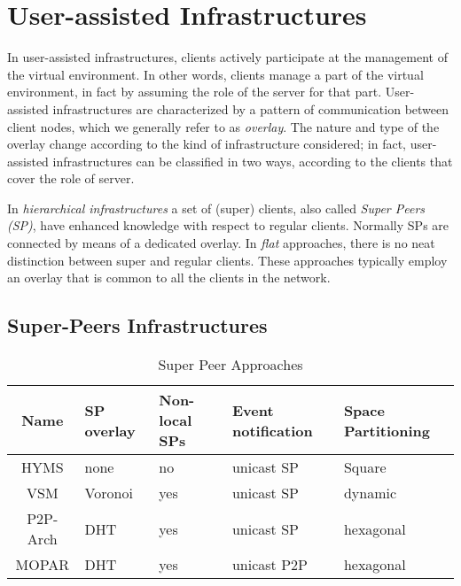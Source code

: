 \documentclass[final,10pt,a5paper]{phdimt}
\theoremstyle{definition}
\begin{document}
\section{User-assisted Infrastructures}
\label{p2p}

In user-assisted infrastructures, clients actively participate at the management of the virtual environment. 
In other words, clients manage a part of the virtual environment, in fact by assuming the role of the server for that part.
User-assisted infrastructures are characterized by a pattern of communication between client nodes, which we generally refer to as \textit{overlay}. The nature and type of the overlay change according to the kind of infrastructure considered; in fact, user-assisted infrastructures can be classified in two ways, according to the clients that cover the role of server.

In \textit{hierarchical infrastructures} a set of (super) clients, also called \textit{Super Peers (SP)}, have enhanced knowledge with respect to regular clients. Normally SPs are connected by means of a dedicated overlay.
In \textit{flat} approaches, there is no neat distinction between super and regular clients.
These approaches typically employ an overlay that is common to all the clients in the network.




\subsection{Super-Peers Infrastructures}


\begin{table}[tbh]
\centering
\begin{tabular}{|c|p{1.3cm}|p{1.4 cm}|p{1.8cm}|p{1.7 cm}|}
\hline
Name & SP \newline overlay & Non-local \newline SPs & Event \newline notification & Space \newline Partitioning \\
\hline
\hline
HYMS \cite{Kim2004} & none & no & unicast SP & Square\\
\hline
VSM \cite{hu2008voronoi} & Voronoi & yes & unicast SP & dynamic \\
\hline
P2P-Arch \cite{Hampel2006} & DHT & yes & unicast SP & hexagonal\\
\hline
MOPAR \cite{Vuong2005} & DHT & yes & unicast P2P & hexagonal\\
\hline
\end{tabular}
\caption{Super Peer Approaches}\label{tab:sp}
\end{table}
\end{document}
